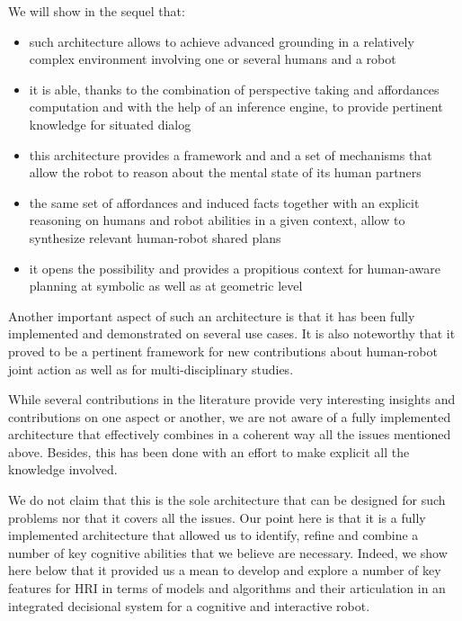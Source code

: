 \documentclass[preprint,3p,times]{elsarticle}
\begin{document}
We will show in the sequel that:
\begin{itemize}

\item such architecture allows to achieve advanced grounding in a relatively complex environment 
involving one or several humans and a robot

\item  it is able, thanks to the combination of perspective taking and affordances computation 
and with the help of an inference engine, to provide pertinent knowledge for situated dialog 

\item  this architecture provides a framework and and a set of mechanisms that allow 
the robot to reason about the mental state of its human partners

\item  the same set of affordances and induced facts together with an explicit reasoning
on humans and robot abilities in a given context,  allow to synthesize relevant human-robot shared plans

\item  it opens the possibility and provides a propitious context for human-aware planning 
at symbolic as well as at geometric level

\end{itemize}

Another important aspect of such an architecture is that it has been fully implemented and 
demonstrated on several use cases. It is also noteworthy that it proved to be a pertinent 
framework  for new contributions about human-robot joint  action as well as for multi-disciplinary studies.

While several contributions in the literature provide very interesting insights and contributions 
on one aspect or another, we are not aware of a fully implemented architecture that effectively
combines in a coherent way all the issues mentioned above. Besides, this has been done with an effort
to make explicit all the knowledge involved.

We do not claim that this is the sole architecture that can be designed for such problems nor that it
covers all the issues. Our point here is that it is a fully implemented architecture that allowed us to
identify, refine and combine a number of key cognitive abilities that we believe are necessary. Indeed, 
we show here below that it provided us a mean to develop and explore a number of key features for HRI 
in terms of models and algorithms and their articulation in an integrated decisional system for a 
cognitive and interactive robot.
\end{document}
